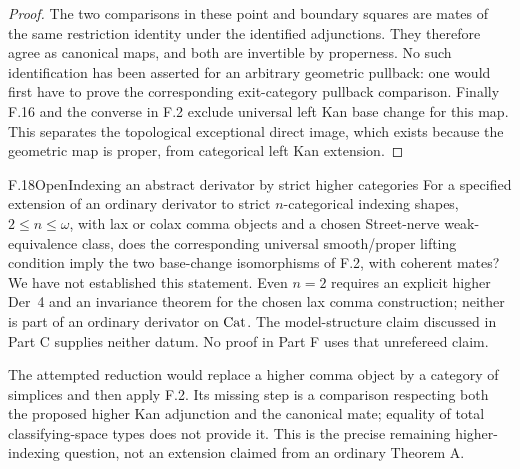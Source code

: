 \begin{proof}
The two comparisons in these point and boundary squares are mates of the same restriction identity under the identified adjunctions. They therefore agree as canonical maps, and both are invertible by properness. No such identification has been asserted for an arbitrary geometric pullback: one would first have to prove the corresponding exit-category pullback comparison. Finally F.16 and the converse in F.2 exclude universal left Kan base change for this map. This separates the topological exceptional direct image, which exists because the geometric map is proper, from categorical left Kan extension.
\end{proof}

\begin{claim}{F.18}{Open}{Indexing an abstract derivator by strict higher categories}
For a specified extension of an ordinary derivator to strict $n$-categorical indexing shapes, $2\leq n\leq\omega$, with lax or colax comma objects and a chosen Street-nerve weak-equivalence class, does the corresponding universal smooth/proper lifting condition imply the two base-change isomorphisms of F.2, with coherent mates? We have not established this statement. Even $n=2$ requires an explicit higher Der~4 and an invariance theorem for the chosen lax comma construction; neither is part of an ordinary derivator on $\mathrm{Cat}$. The model-structure claim discussed in Part C supplies neither datum. No proof in Part F uses that unrefereed claim.
\end{claim}
The attempted reduction would replace a higher comma object by a category of simplices and then apply F.2. Its missing step is a comparison respecting both the proposed higher Kan adjunction and the canonical mate; equality of total classifying-space types does not provide it. This is the precise remaining higher-indexing question, not an extension claimed from an ordinary Theorem A.


